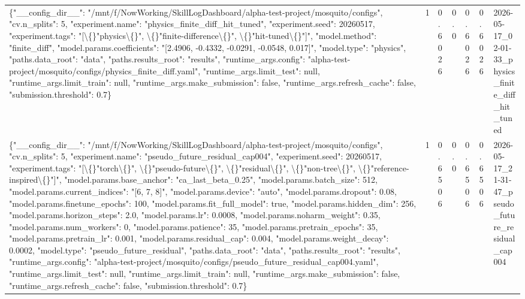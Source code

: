 \begin{tabular}{lllllll}
\{"\_\_config\_dir\_\_": "/mnt/f/NowWorking/SkillLogDashboard/alpha-test-project/mosquito/configs", "cv.n\_splits": 5, "experiment.name": "physics\_finite\_diff\_hit\_tuned", "experiment.seed": 20260517, "experiment.tags": "[\textbackslash\{\}"physics\textbackslash\{\}", \textbackslash\{\}"finite-difference\textbackslash\{\}", \textbackslash\{\}"hit-tuned\textbackslash\{\}"]", "model.method": "finite\_diff", "model.params.coefficients": "[2.4906, -0.4332, -0.0291, -0.0548, 0.017]", "model.type": "physics", "paths.data\_root": "data", "paths.results\_root": "results", "runtime\_args.config": "alpha-test-project/mosquito/configs/physics\_finite\_diff.yaml", "runtime\_args.limit\_test": null, "runtime\_args.limit\_train": null, "runtime\_args.make\_submission": false, "runtime\_args.refresh\_cache": false, "submission.threshold": 0.7\} & 1 & 0.6026 & 0.0 & 0.6026 & 0.6026 & 2026-05-17\_02-01-33\_physics\_finite\_diff\_hit\_tuned \\
\{"\_\_config\_dir\_\_": "/mnt/f/NowWorking/SkillLogDashboard/alpha-test-project/mosquito/configs", "cv.n\_splits": 5, "experiment.name": "pseudo\_future\_residual\_cap004", "experiment.seed": 20260517, "experiment.tags": "[\textbackslash\{\}"torch\textbackslash\{\}", \textbackslash\{\}"pseudo-future\textbackslash\{\}", \textbackslash\{\}"residual\textbackslash\{\}", \textbackslash\{\}"non-tree\textbackslash\{\}", \textbackslash\{\}"reference-inspired\textbackslash\{\}"]", "model.params.base\_anchor": "ca\_last\_beta\_0.25", "model.params.batch\_size": 512, "model.params.current\_indices": "[6, 7, 8]", "model.params.device": "auto", "model.params.dropout": 0.08, "model.params.finetune\_epochs": 100, "model.params.fit\_full\_model": true, "model.params.hidden\_dim": 256, "model.params.horizon\_steps": 2.0, "model.params.lr": 0.0008, "model.params.noharm\_weight": 0.35, "model.params.num\_workers": 0, "model.params.patience": 35, "model.params.pretrain\_epochs": 35, "model.params.pretrain\_lr": 0.001, "model.params.residual\_cap": 0.004, "model.params.weight\_decay": 0.0002, "model.type": "pseudo\_future\_residual", "paths.data\_root": "data", "paths.results\_root": "results", "runtime\_args.config": "alpha-test-project/mosquito/configs/pseudo\_future\_residual\_cap004.yaml", "runtime\_args.limit\_test": null, "runtime\_args.limit\_train": null, "runtime\_args.make\_submission": false, "runtime\_args.refresh\_cache": false, "submission.threshold": 0.7\} & 1 & 0.6506 & 0.0 & 0.6506 & 0.6506 & 2026-05-17\_21-31-47\_pseudo\_future\_residual\_cap004 \\

\end{tabular}
